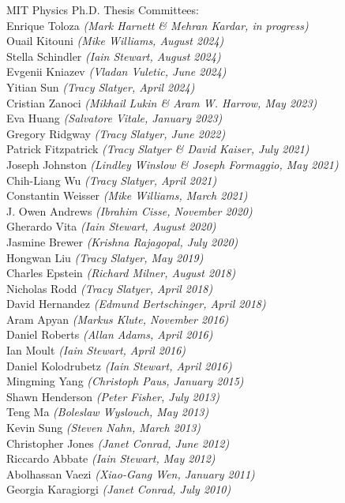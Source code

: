 \bbl

\item MIT Physics Ph.D. Thesis Committees:
\\ Enrique Toloza \textit{(Mark Harnett \& Mehran Kardar, in progress)}
\\ Ouail Kitouni \textit{(Mike Williams, August 2024)}
\\ Stella Schindler \textit{(Iain Stewart, August 2024)}
\\ Evgenii Kniazev \textit{(Vladan Vuletic, June 2024)}
\\ Yitian Sun \textit{(Tracy Slatyer, April 2024)}
\\ Cristian Zanoci \textit{(Mikhail Lukin \& Aram W. Harrow, May 2023)}
\\ Eva Huang \textit{(Salvatore Vitale, January 2023)}
\\ Gregory Ridgway \textit{(Tracy Slatyer, June 2022)}
\\ Patrick Fitzpatrick \textit{(Tracy Slatyer \& David Kaiser, July 2021)}
\\ Joseph Johnston \textit{(Lindley Winslow \& Joseph Formaggio, May 2021)}
\\ Chih-Liang Wu \textit{(Tracy Slatyer, April 2021)}
\\ Constantin Weisser \textit{(Mike Williams, March 2021)}
\\ J. Owen Andrews \textit{(Ibrahim Cisse, November 2020)}
\\ Gherardo Vita \textit{(Iain Stewart, August 2020)}
\\ Jasmine Brewer \textit{(Krishna Rajagopal, July 2020)}
\\ Hongwan Liu \textit{(Tracy Slatyer, May 2019)}
\\ Charles Epstein \textit{(Richard Milner, August 2018)}
\\ Nicholas Rodd \textit{(Tracy Slatyer, April 2018)}
\\ David Hernandez \textit{(Edmund Bertschinger, April 2018)}
\\ Aram Apyan \textit{(Markus Klute, November 2016)}
\\ Daniel Roberts \textit{(Allan Adams, April 2016)}
\\ Ian Moult \textit{(Iain Stewart, April 2016)}
\\ Daniel Kolodrubetz \textit{(Iain Stewart, April 2016)}
\\ Mingming Yang \textit{(Christoph Paus, January 2015)}
\\ Shawn Henderson \textit{(Peter Fisher, July 2013)}
\\ Teng Ma \textit{(Boleslaw Wyslouch, May 2013)}
\\ Kevin Sung \textit{(Steven Nahn, March 2013)}
\\ Christopher Jones \textit{(Janet Conrad, June 2012)}
\\ Riccardo Abbate \textit{(Iain Stewart, May 2012)}
\\ Abolhassan Vaezi \textit{(Xiao-Gang Wen, January 2011)}
\\ Georgia Karagiorgi \textit{(Janet Conrad, July 2010)}

